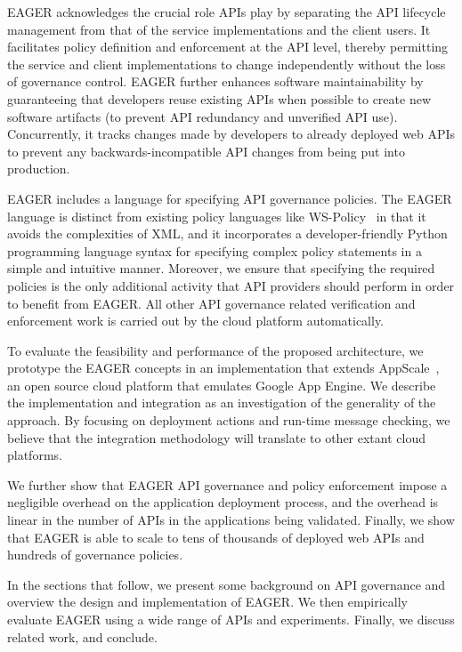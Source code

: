 EAGER acknowledges the crucial role APIs play
 by separating the API lifecycle management from that
of the service implementations and the client users.  
It facilitates policy definition and enforcement at
the API level, thereby permitting the service and client implementations to change
independently without the loss of governance control.
EAGER further enhances software maintainability by guaranteeing that 
developers reuse existing APIs when possible to create new software artifacts
(to prevent API redundancy and unverified API use). Concurrently, it
tracks changes made by developers to already deployed web APIs to prevent
any backwards-incompatible API changes from being put into production.

EAGER includes a language for specifying 
API governance policies.  The EAGER language is distinct from 
existing policy languages like WS-Policy~\cite{WSPolicy,soagovstandard}
in that it avoids the complexities of XML, 
and it incorporates a developer-friendly Python programming language syntax for 
specifying complex policy statements in a simple and 
intuitive manner. Moreover, we ensure that specifying the required policies 
is the only additional activity that API providers should perform in
order to benefit from EAGER. All other API governance related verification and 
enforcement work is carried out by the cloud platform automatically.

To evaluate the feasibility and performance of the proposed 
architecture, we prototype the EAGER concepts in an implementation
that extends AppScale~\cite{appscale13}, 
an open source
cloud platform that emulates Google App Engine. We describe
the implementation and integration as an investigation of
the generality of the approach.  By focusing on deployment actions and
run-time message checking, we believe that the integration methodology
will translate to other extant cloud platforms.


We further show that 
EAGER API governance and policy enforcement impose a negligible 
overhead on the application deployment process, and the overhead
is linear in the number of APIs in the applications 
being validated.  
Finally, we show that EAGER is able to
scale to tens of thousands of deployed web APIs and hundreds of
governance policies.

In the sections that follow, we present some background on API governance
and overview the design and implementation of
EAGER. We then empirically evaluate EAGER using a wide range of APIs and
experiments.  Finally, we discuss related work, and conclude.